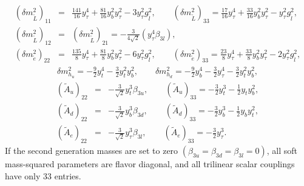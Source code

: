 \documentclass[12pt]{article}
\begin{document}
\begin{eqnarray}
(\delta m_{\tilde{L}}^2)_{11}&=&\frac{141}{16}y_\tau^4+\frac{81}{16}y_b^2 y_\tau^2 - 3y_\tau^2 g_{\tilde{l}}^2, \qquad
(\delta m_{\tilde{L}}^2)_{33}=
\frac{17}{16}y_\tau^4+\frac{33}{16}y_b^2 y_\tau^2 - y_\tau^2 g_{\tilde{l}}^2,  \nonumber \\
(\delta m_{\tilde{L}}^2)_{12} &=&
(\delta m_{\tilde{L}}^2)_{21}=-\frac{3}{4\sqrt{2}}(y_\tau^4\beta_{3l}), \nonumber \\
(\delta m_{\tilde{e}}^2)_{22}&=&\frac{135}{8}y_\tau^4+\frac{81}{8}y_b^2y_\tau^2 - 6y_\tau^2 g_{\tilde{l}}^2, \qquad 
(\delta m_{\tilde{e}}^2)_{33}=
\frac{23}{8}y_\tau^4+\frac{33}{8}y_b^2 y_\tau^2- 2y_\tau^2 g_{\tilde{l}}^2,
\end{eqnarray}
\begin{eqnarray}
\delta m_{h_u}^2=-\frac{9}{2}y_t^4-\frac{3}{2}y_t^2y_b^2,\qquad \delta m_{h_d}^2=-\frac{9}{2}y_b^4-\frac{3}{2}y_\tau^4-\frac{3}{2}y_t^2y_b^2,
\end{eqnarray}
\begin{eqnarray}
(\tilde{A}_u)_{22}&=&-\frac{3}{\sqrt{2}}y_t^3\beta_{3u}, \qquad (\tilde{A}_u)_{33}=-\frac{3}{2}y_t^3-\frac{1}{2}y_t y_b^2, \nonumber \\
(\tilde{A}_d)_{22}&=&-\frac{3}{\sqrt{2}}y_b^3\beta_{3d}, \qquad (\tilde{A}_d)_{33}=-\frac{3}{2}y_b^3-\frac{1}{2}y_b y_t^2, \nonumber \\
(\tilde{A}_e)_{22}&=&-\frac{3}{\sqrt{2}}y_\tau^3\beta_{3l}, \qquad (\tilde{A}_e)_{33}=-\frac{3}{2}y_\tau^3. 
\end{eqnarray}
If the second generation masses are set to zero $(\beta_{3u}=\beta_{3d}=\beta_{3l}=0)$, all soft mass-squared parameters are flavor diagonal, and all trilinear scalar couplings have only $33$ entries.
\end{document}
